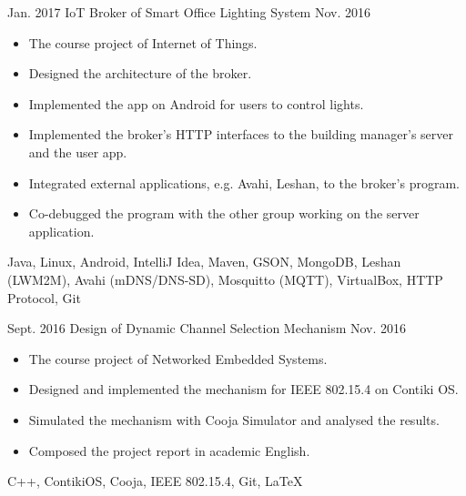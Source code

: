 %
%
%
%
%


\begin{projects}
  
  
  \project
    {Jan. 2017}   {IoT Broker of Smart Office Lighting System}
    {Nov. 2016} {
                      \begin{itemize}
                        \item The course project of Internet of Things.
                        \item Designed the architecture of the broker.
                        \item Implemented the app on Android for users to control lights.  
                        \item Implemented the broker’s HTTP interfaces to the building manager's server and the user app.
                        \item Integrated external applications, e.g. Avahi, Leshan, to the broker's program.
                        \item Co-debugged the program with the other group working on the server application.           
                      \end{itemize}
                    }
                    {Java, Linux, Android, IntelliJ Idea, Maven, GSON, MongoDB, Leshan (LWM2M), Avahi (mDNS/DNS-SD), Mosquitto (MQTT), VirtualBox, HTTP Protocol, Git}
  \emptySeparator
  
  
  \project
    {Sept. 2016} {Design of Dynamic Channel Selection Mechanism}
    {Nov. 2016}    {
                      \begin{itemize}
                        \item The course project of Networked Embedded Systems.
                        \item Designed and implemented the mechanism for IEEE 802.15.4 on Contiki OS. 
                        \item Simulated the mechanism with Cooja Simulator and analysed the results.
                        \item Composed the project report in academic English.
                      \end{itemize}
                    }
                    {C++, ContikiOS, Cooja, IEEE 802.15.4, Git, \LaTeX}
  \emptySeparator
  

\end{projects}
